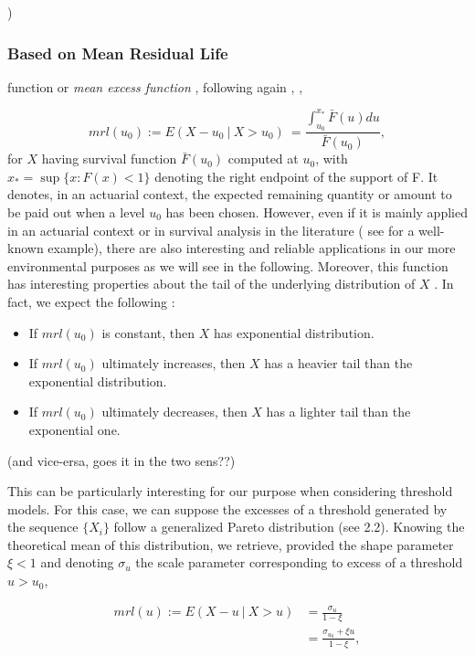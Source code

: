 )

\subsubsection*{Based on Mean Residual Life} function or \emph{mean excess function} 
, following again \cite[pp.14-19]{beirlant_statistics_2006}, \cite[pp.78-80]{coles_introduction_2001},

\begin{equation}
mrl(u_0)
:=E(X-u_0\ |\ X>u_0) 
\ = \frac{\int_{u_0}^{x_*} \bar{F}(u)du}{\bar{F}(u_0)},
\end{equation}
for $X$ having survival function $\bar{F}(u_0)$ computed at $u_0$, with $x_*=\sup\{ x:F(x)<1\}$ denoting the right endpoint of the support of F. 
It denotes, in an actuarial context, the expected remaining quantity or amount to be paid out when a level $u_0$ has been chosen. However, even if it is mainly applied in an actuarial context or in survival analysis in the literature ( see \cite{guess_mean_1988} for a well-known example), there are also interesting and reliable applications in our more environmental purposes as we will see in the following.
Moreover, this function has interesting properties about the tail of the underlying distribution of $X$ \cite[pp.16]{beirlant_statistics_2006}. In fact, we expect the following :

\begin{itemize}
	\item If $mrl(u_0)$ is constant, then $X$ has exponential distribution.
	\item If $mrl(u_0)$ ultimately increases, then $X$ has a heavier tail than the exponential distribution.
	\item If $mrl(u_0)$ ultimately decreases, then $X$ has a lighter tail than the exponential one.
\end{itemize} (and vice-ersa, goes it in the two sens??)

This can be particularly interesting for our purpose when considering threshold models. For this case, we can suppose the excesses of a threshold generated by the sequence $\{X_i\}$ follow a generalized Pareto distribution (see 2.2). Knowing the theoretical mean of this distribution, we retrieve, provided the shape parameter $\xi<1$ and denoting $\sigma_u$ the scale parameter corresponding to excess of a threshold $u>u_0$,

\begin{equation} \label{mrl}
\begin{aligned}
mrl(u):=E(X-u\ |\ X>u)
& = \frac{\sigma_u}{1-\xi} \\
& = \frac{\sigma_{u_0}+\xi u}{1-\xi},
\end{aligned}
\end{equation}


